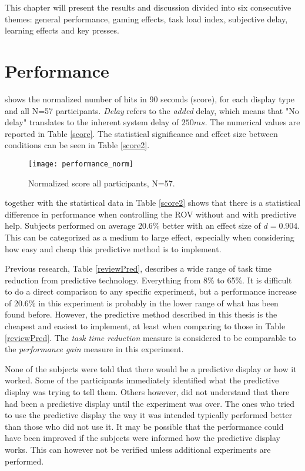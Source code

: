 This chapter will present the results and discussion divided into six consecutive themes: general performance, gaming effects, task load index, subjective delay, learning effects and key presses.

\section{Performance}

 shows the normalized number of hits in 90 seconds (score), for each display type and all N=57 participants. \textit{Delay} refers to the \textit{added} delay, which means that "No delay" translates to the inherent system delay of $250 ms$. The numerical values are reported in Table \ref{score}. The statistical significance and effect size between conditions can be seen in Table \ref{score2}.

\begin{figure}[h!]
    \centering
    \texttt{[image: performance\_norm]}
    \caption{Normalized score all participants, N=57.}
    \label{performanceNorm}
	\vspace{-0.2cm}
\end{figure}





 together with the statistical data in Table \ref{score2} shows that there is a statistical difference in performance when controlling the ROV without and with predictive help. Subjects performed on average 20.6\% better with an effect size of $d=0.904$. This can be categorized as a medium to large effect, especially when considering how easy and cheap this predictive method is to implement.

Previous research, Table \ref{reviewPred}, describes a wide range of task time reduction from predictive technology. Everything from 8\% to 65\%. It is difficult to do a direct comparison to any specific experiment, but a performance increase of 20.6\% in this experiment is probably in the lower range of what has been found before. However, the predictive method described in this thesis is the cheapest and easiest to implement, at least when comparing to those in Table \ref{reviewPred}. The \emph{task time reduction} measure is considered to be comparable to the \emph{performance gain} measure in this experiment.

None of the subjects were told that there would be a predictive display or how it worked. Some of the participants immediately identified what the predictive display was trying to tell them. Others however, did not understand that there had been a predictive display until the experiment was over. The ones who tried to use the predictive display the way it was intended typically performed better than those who did not use it. It may be possible that the performance could have been improved if the subjects were informed how the predictive display works. This can however not be verified unless additional experiments are performed.

